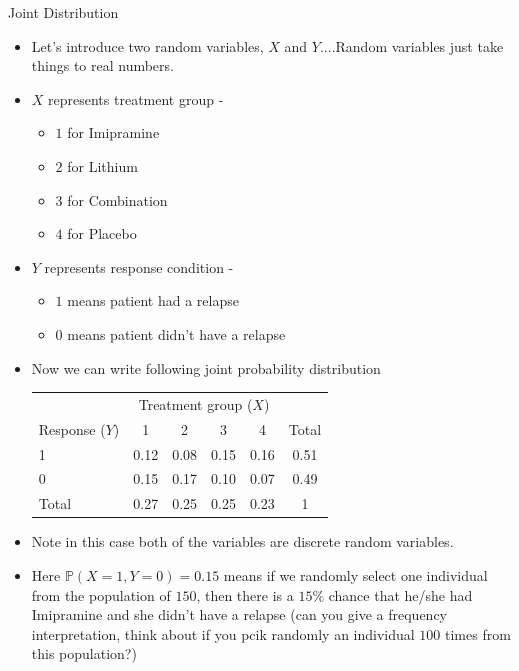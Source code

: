 \documentclass[8pt, usepdftitle=false]{beamer}
\begin{document}
\begin{frame}{Joint Distribution}




\begin{itemize}

\item Let's introduce two random variables, $X$ and $Y$....Random variables just take things to real numbers.

\item $X$ represents treatment group -  

\begin{itemize}

 \item $1$ for Imipramine
 \item $2$ for Lithium
 \item  $3$ for Combination
 \item $4$ for Placebo

\end{itemize}


\item $Y$ represents response condition -  
 


\begin{itemize}

 \item $1$ means patient had a relapse
 \item $0$ means patient didn't have a relapse

 
\end{itemize}

\item Now we can write following joint probability distribution


\begin{table}
\centering
  \begin{tabular}{|lcccc|c|}
\hline & \multicolumn{4}{c}{ Treatment group ($X$) } & \\
\cline { 2 - 6 } Response ($Y$) & 1 & 2 & 3 & 4 & Total \\
\hline 1 & 0.12 & 0.08 & 0.15 & 0.16 & 0.51 \\
0 & 0.15 & 0.17 & 0.10 & 0.07 & 0.49 \\
\hline Total & 0.27 & 0.25 & 0.25 & 0.23 & 1 \\
\hline
\end{tabular}
\end{table}

\item Note in this case both of the variables are discrete random variables.


\item Here $\mathbb{P}(X = 1, Y = 0) = 0.15$ means if we randomly select one individual from the \alert{population of $150$}, then there is a $15\%$ chance that he/she had Imipramine and she didn't have a relapse (can you give a frequency interpretation, think about if you pcik randomly an individual $100$ times from this population?)
  
\end{itemize}


\end{frame}
\end{document}
